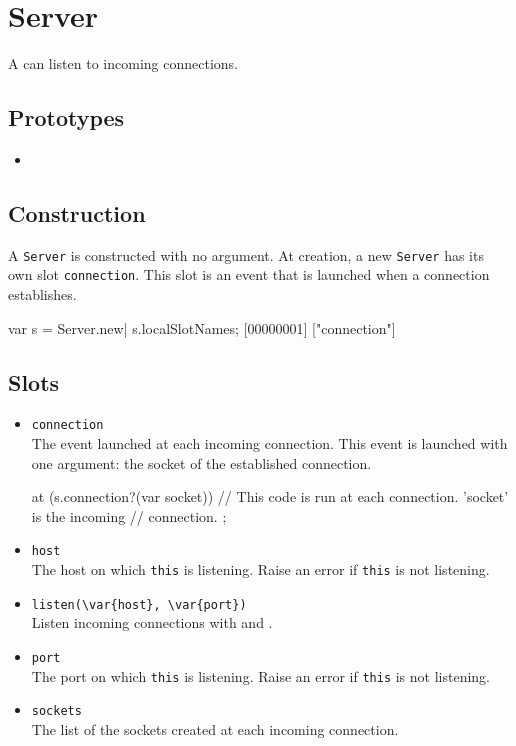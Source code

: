 \section{Server}

A  can listen to incoming connections.

\subsection{Prototypes}
\begin{itemize}
\item {}
\end{itemize}

\subsection{Construction}

A \lstinline|Server| is constructed with no argument. At creation, a
new \lstinline|Server| has its own slot \lstinline|connection|. This
slot is an event that is launched when a connection establishes.

\begin{urbiscript}
var s = Server.new|
s.localSlotNames;
[00000001] ["connection"]
\end{urbiscript}

\subsection{Slots}
\begin{itemize}
\item \lstinline|connection|\\
  The event launched at each incoming connection. This event is
  launched with one argument: the socket of the established connection.
\begin{urbiscript}[firstnumber=last]
at (s.connection?(var socket))
{
  // This code is run at each connection. 'socket' is the incoming
  // connection.
};
\end{urbiscript}

\item \lstinline|host|\\
  The host on which \lstinline|this| is listening. Raise an error if
  \lstinline|this| is not listening.

\item \lstinline|listen(\var{host}, \var{port})|\\
  Listen incoming connections with  and .

\item \lstinline|port|\\
  The port on which \lstinline|this| is listening. Raise an error if
  \lstinline|this| is not listening.

\item \lstinline|sockets|\\
  The list of the sockets created at each incoming connection.
\end{itemize}
